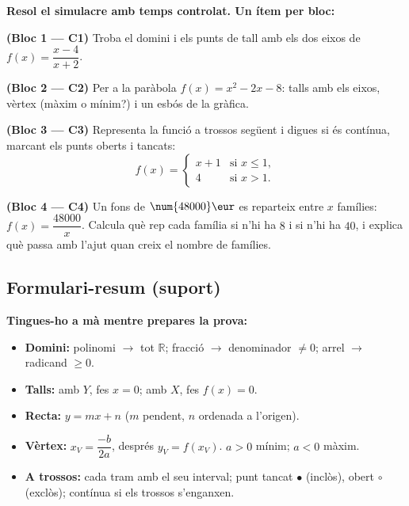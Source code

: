 \begin{exercicis}
\textbf{Resol el simulacre amb temps controlat. Un ítem per bloc:}
\begin{exlist}
  \item \textbf{(Bloc 1 — C1)} Troba el domini i els punts de tall amb els dos eixos
        de $f(x)=\dfrac{x-4}{x+2}$.
  \item \textbf{(Bloc 2 — C2)} Per a la paràbola $f(x)=x^2-2x-8$: talls amb els eixos,
        vèrtex (màxim o mínim?) i un esbós de la gràfica.
  \item \textbf{(Bloc 3 — C3)} Representa la funció a trossos següent i digues si és
        contínua, marcant els punts oberts i tancats:
        \[
        f(x)=
        \begin{cases}
        x+1 & \text{si } x\le 1,\\[2pt]
        4 & \text{si } x>1.
        \end{cases}
        \]
  \item \textbf{(Bloc 4 — C4)} Un fons de $\num{48000}\eur$ es reparteix entre $x$
        famílies: $f(x)=\dfrac{\num{48000}}{x}$. Calcula què rep cada família si n'hi
        ha $8$ i si n'hi ha $40$, i explica què passa amb l'ajut quan creix el nombre
        de famílies.
\end{exlist}
\end{exercicis}

\subsection{Formulari-resum (suport)}

\begin{idea}
\textbf{Tingues-ho a mà mentre prepares la prova:}
\begin{itemize}[leftmargin=1.4em, itemsep=2pt]
  \item \textbf{Domini:} polinomi $\rightarrow$ tot $\mathbb{R}$; fracció
        $\rightarrow$ denominador $\neq 0$; arrel $\rightarrow$ radicand $\ge 0$.
  \item \textbf{Talls:} amb $Y$, fes $x=0$; amb $X$, fes $f(x)=0$.
  \item \textbf{Recta:} $y=mx+n$ ($m$ pendent, $n$ ordenada a l'origen).
  \item \textbf{Vèrtex:} $x_V=\dfrac{-b}{2a}$, després $y_V=f(x_V)$. $a>0$ mínim;
        $a<0$ màxim.
  \item \textbf{A trossos:} cada tram amb el seu interval; punt tancat $\bullet$
        (inclòs), obert $\circ$ (exclòs); contínua si els trossos s'enganxen.
\end{itemize}
\end{idea}

